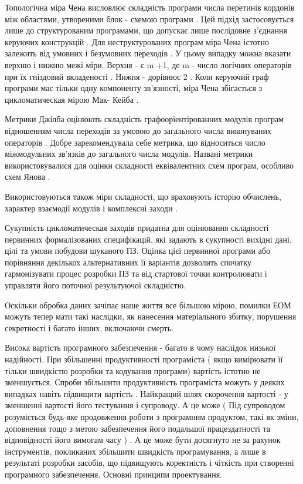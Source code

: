 Топологічна міра Чена висловлює складність програми числа перетинів кордонів між областями, утвореними блок - схемою програми . Цей підхід застосовується лише до структурованим програмами, що допускає лише послідовне з'єднання керуючих конструкцій . Для неструктурованих програм міра Чена істотно залежить від умовних і безумовних переходів . У цьому випадку можна вказати верхню і нижню межі міри. Верхня - є m +1, де m - число логічних операторів при їх гніздовий вкладеності . Нижня - дорівнює 2 . Коли керуючий граф програми має тільки одну компоненту зв'язності, міра Чена збігається з цикломатическая мірою Мак- Кейба .

Метрики Джілба оцінюють складність графооріентірованних модулів програм відношенням числа переходів за умовою до загального числа виконуваних операторів . Добре зарекомендувала себе метрика, що відноситься число міжмодульних зв'язків до загального числа модулів. Названі метрики використовувалися для оцінки складності еквівалентних схем програм, особливо схем Янова .

Використовуються також міри складності, що враховують історію обчислень, характер взаємодії модулів і комплексні заходи .

Сукупність цикломатическая заходів придатна для оцінювання складності первинних формалізованих специфікацій, які задають в сукупності вихідні дані, цілі та умови побудови шуканого ПЗ. Оцінка цієї первинної програми або порівняння декількох альтернативних її варіантів дозволить спочатку гармонізувати процес розробки ПЗ та від стартової точки контролювати і управляти його поточної результуючої складністю.

Оскільки обробка даних зачіпає наше життя все більшою мірою, помилки ЕОМ можуть тепер мати такі наслідки, як нанесення матеріального збитку, порушення секретності і багато інших, включаючи смерть.

Висока вартість програмного забезпечення - багато в чому наслідок низької надійності. При збільшенні продуктивності програміста ( якщо вимірювати її тільки швидкістю розробки та кодування програми) вартість істотно не зменшується. Спроби збільшити продуктивність програміста можуть у деяких випадках навіть підвищити вартість . Найкращий шлях скорочення вартості - у зменшенні вартості його тестування і супроводу. А це може ( Під супроводом розуміється будь-яке продовження роботи з програмним продуктом, такі як зміни, доповнення тощо з метою забезпечення його подальшої працездатності та відповідності його вимогам часу ) . А це може бути досягнуто не за рахунок інструментів, покликаних збільшити швидкість програмування, а лише в результаті розробки засобів, що підвищують коректність і чіткість при створенні програмного забезпечення.
Основні принципи проектування.

